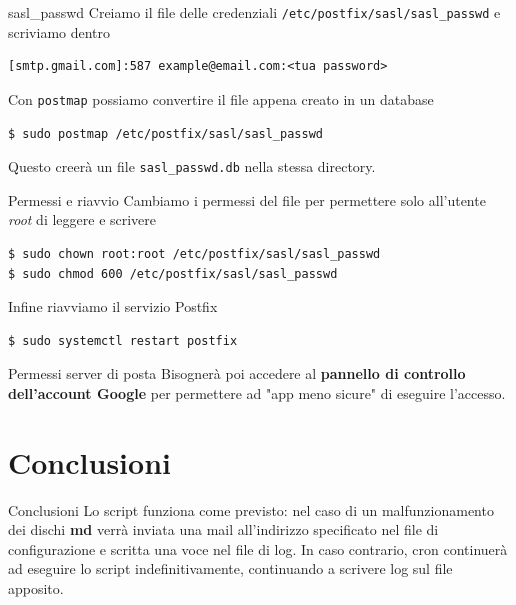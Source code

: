 \documentclass{beamer}
\begin{document}
\begin{frame}[fragile]{sasl\_passwd}
Creiamo il file delle credenziali \texttt{/etc/postfix/sasl/sasl\_passwd} e scriviamo dentro
\begin{verbatim}
[smtp.gmail.com]:587 example@email.com:<tua password>
\end{verbatim}
Con \texttt{postmap} possiamo convertire il file appena creato in un database
\begin{verbatim}
$ sudo postmap /etc/postfix/sasl/sasl_passwd
\end{verbatim}
Questo creerà un file \texttt{sasl\_passwd.db} nella stessa directory.
\end{frame}

\begin{frame}[fragile]{Permessi e riavvio}
Cambiamo i permessi del file per permettere solo all'utente \textit{root} di leggere e scrivere
\begin{verbatim}
$ sudo chown root:root /etc/postfix/sasl/sasl_passwd
$ sudo chmod 600 /etc/postfix/sasl/sasl_passwd
\end{verbatim}
Infine riavviamo il servizio Postfix
\begin{verbatim}
$ sudo systemctl restart postfix
\end{verbatim}
\end{frame}

\begin{frame}[fragile]{Permessi server di posta}
Bisognerà poi accedere al \textbf{pannello di controllo dell'account Google} per permettere ad "app meno sicure" di eseguire l'accesso.
\end{frame}

\section{Conclusioni}
\begin{frame}[fragile]{Conclusioni}
    Lo script funziona come previsto: nel caso di un malfunzionamento dei dischi \textbf{md} verrà inviata una mail all'indirizzo specificato nel file di configurazione e scritta una voce nel file di log. In caso contrario, cron continuerà ad eseguire lo script indefinitivamente, continuando a scrivere log sul file apposito.
\end{frame}
\end{document}

